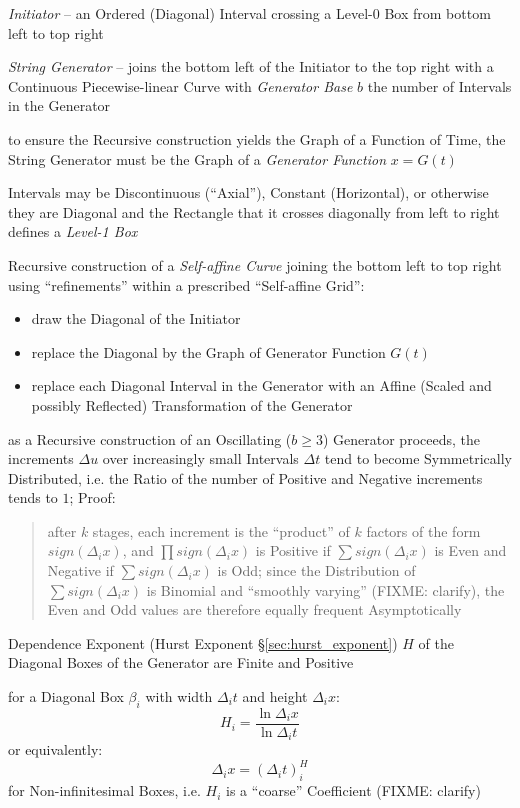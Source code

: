 \emph{Initiator} -- an Ordered (Diagonal) Interval crossing a Level-0 Box
from bottom left to top right

\emph{String Generator} -- joins the bottom left of the Initiator to the top
right with a Continuous Piecewise-linear Curve with \emph{Generator Base} $b$
the number of Intervals in the Generator

to ensure the Recursive construction yields the Graph of a Function of Time, the
String Generator must be the Graph of a \emph{Generator Function} $x = G(t)$

Intervals may be Discontinuous (``Axial''), Constant (Horizontal), or otherwise
they are Diagonal and the Rectangle that it crosses diagonally from left to
right defines a \emph{Level-1 Box}

Recursive construction of a \emph{Self-affine Curve} joining the bottom left to
top right using ``refinements'' within a prescribed ``Self-affine Grid'':
\begin{itemize}
  \item draw the Diagonal of the Initiator
  \item replace the Diagonal by the Graph of Generator Function $G(t)$
  \item replace each Diagonal Interval in the Generator with an Affine (Scaled
    and possibly Reflected) Transformation of the Generator
\end{itemize}

as a Recursive construction of an Oscillating ($b \geq 3$) Generator proceeds,
the increments $\Delta u$ over increasingly small Intervals $\Delta t$ tend to
become Symmetrically Distributed, i.e. the Ratio of the number of Positive and
Negative increments tends to $1$; Proof:
\begin{quote}
  after $k$ stages, each increment is the ``product'' of $k$ factors of the form
  $sign(\Delta_i x)$, and $\prod sign(\Delta_i x)$ is Positive if
  $\sum sign(\Delta_i x)$ is Even and Negative if $\sum sign(\Delta_i x)$ is
  Odd; since the Distribution of $\sum sign(\Delta_i x)$ is Binomial and
  ``smoothly varying'' (FIXME: clarify), the Even and Odd values are therefore
  equally frequent Asymptotically
\end{quote}

Dependence Exponent (Hurst Exponent \S\ref{sec:hurst_exponent}) $H$ of the
Diagonal Boxes of the Generator are Finite and Positive

for a Diagonal Box $\beta_i$ with width $\Delta_i t$ and height $\Delta_i x$:
\[
  H_i = \frac{\ln \Delta_i x}{\ln \Delta_i t}
\]
or equivalently:
\[
  \Delta_i x = (\Delta_i t)^H_i
\]
for Non-infinitesimal Boxes, i.e. $H_i$ is a ``coarse'' Coefficient (FIXME:
clarify)

